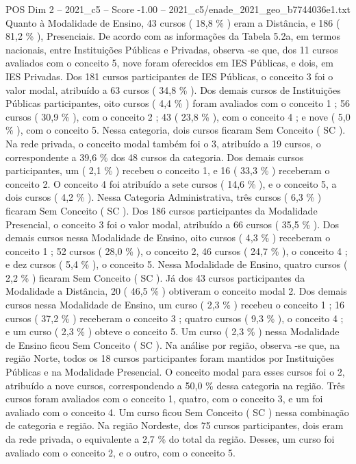 \begin{textsample}{POS Dim 2 – 2021\_c5 – Score -1.00 – 2021\_c5/enade\_2021\_geo\_b7744036e1.txt}
Quanto à Modalidade de Ensino, 43 cursos ( 18,8 \% ) eram a Distância, e 186 ( 81,2 \% ), Presenciais.
De acordo com as informações da Tabela 5.2a, em termos nacionais, entre Instituições Públicas e Privadas, observa -se que, dos 11 cursos avaliados com o conceito 5, nove foram oferecidos em IES Públicas, e dois, em IES Privadas.
Dos 181 cursos participantes de IES Públicas, o conceito 3 foi o valor modal, atribuído a 63 cursos ( 34,8 \% ).
Dos demais cursos de Instituições Públicas participantes, oito cursos ( 4,4 \% ) foram avaliados com o conceito 1 ; 56 cursos ( 30,9 \% ), com o conceito 2 ; 43 ( 23,8 \% ), com o conceito 4 ; e nove ( 5,0 \% ), com o conceito 5.
Nessa categoria, dois cursos ficaram Sem Conceito ( SC ).
Na rede privada, o conceito modal também foi o 3, atribuído a 19 cursos, o correspondente a 39,6 \% dos 48 cursos da categoria.
Dos demais cursos participantes, um ( 2,1 \% ) recebeu o conceito 1, e 16 ( 33,3 \% ) receberam o conceito 2.
O conceito 4 foi atribuído a sete cursos ( 14,6 \% ), e o conceito 5, a dois cursos ( 4,2 \% ).
Nessa Categoria Administrativa, três cursos ( 6,3 \% ) ficaram Sem Conceito ( SC ).
Dos 186 cursos participantes da Modalidade Presencial, o conceito 3 foi o valor modal, atribuído a 66 cursos ( 35,5 \% ).
Dos demais cursos nessa Modalidade de Ensino, oito cursos ( 4,3 \% ) receberam o conceito 1 ; 52 cursos ( 28,0 \% ), o conceito 2, 46 cursos ( 24,7 \% ), o conceito 4 ; e dez cursos ( 5,4 \% ), o conceito 5.
Nessa Modalidade de Ensino, quatro cursos ( 2,2 \% ) ficaram Sem Conceito ( SC ).
Já dos 43 cursos participantes da Modalidade a Distância, 20 ( 46,5 \% ) obtiveram o conceito modal 2.
Dos demais cursos nessa Modalidade de Ensino, um curso ( 2,3 \% ) recebeu o conceito 1 ; 16 cursos ( 37,2 \% ) receberam o conceito 3 ; quatro cursos ( 9,3 \% ), o conceito 4 ; e um curso ( 2,3 \% ) obteve o conceito 5.
Um curso ( 2,3 \% ) nessa Modalidade de Ensino ficou Sem Conceito ( SC ).
Na análise por região, observa -se que, na região Norte, todos os 18 cursos participantes foram mantidos por Instituições Públicas e na Modalidade Presencial.
O conceito modal para esses cursos foi o 2, atribuído a nove cursos, correspondendo a 50,0 \% dessa categoria na região.
Três cursos foram avaliados com o conceito 1, quatro, com o conceito 3, e um foi avaliado com o conceito 4.
Um curso ficou Sem Conceito ( SC ) nessa combinação de categoria e região.
Na região Nordeste, dos 75 cursos participantes, dois eram da rede privada, o equivalente a 2,7 \% do total da região.
Desses, um curso foi avaliado com o conceito 2, e o outro, com o conceito 5.

\end{textsample}

